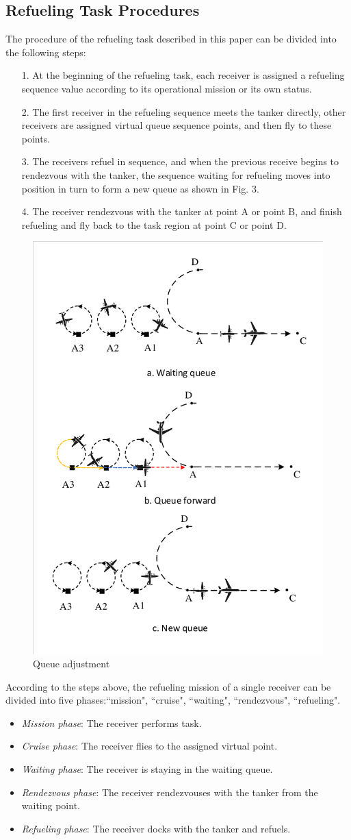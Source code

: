\subsection{Refueling Task Procedures}
The procedure of the refueling task described in this paper can be divided into the following steps:
\begin{itemize}
	\item [ 1.] At the beginning of the refueling task, each receiver is assigned a refueling sequence value according to its operational mission or its own status.
	\item [ 2.] The first receiver in the refueling sequence meets the tanker directly, other receivers are assigned virtual queue sequence points, and then fly to these points.
	\item [ 3.] The receivers refuel in sequence, and when the previous receive begins to rendezvous with the tanker, the sequence waiting for refueling moves into position in turn to form a new queue as shown in Fig. 3.
	\item [ 4.] The receiver rendezvous with the tanker at point A or point B, and finish refueling and fly back to the task region at point C or point D.
\end{itemize}
\begin{figure}[htbp]
	\centerline{\includegraphics[width=.4\textwidth]{Figures/Figs_Ch15/fig2_1.pdf}}
	\caption{Queue adjustment}
	\label{fig}
\end{figure}


According to the steps above, the refueling mission of a single receiver can be divided into five phases:``mission", ``cruise", ``waiting", ``rendezvous", ``refueling".
\begin{itemize}
	\item \textit{Mission phase}: The receiver performs task.
	\item \textit{Cruise phase}: The receiver flies to the assigned virtual point.
	\item \textit{Waiting phase}: The receiver is staying in the waiting queue.
	\item \textit{Rendezvous phase}: The receiver rendezvouses with the tanker from the waiting point.
	\item \textit{Refueling phase}: The receiver docks with the tanker and refuels.
	
\end{itemize}
